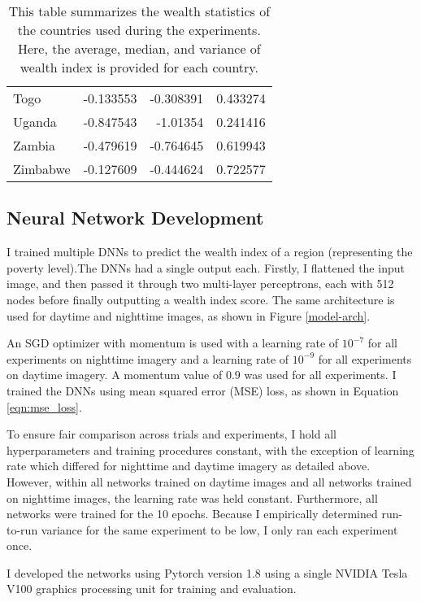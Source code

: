 \documentclass{article}
\begin{document}
\begin{table}[]
\begin{tabular}{lrrr}
 Togo                             & -0.133553   & -0.308391  &  0.433274  \\
 Uganda                           & -0.847543   & -1.01354   &  0.241416  \\
 Zambia                           & -0.479619   & -0.764645  &  0.619943  \\
 Zimbabwe                         & -0.127609   & -0.444624  &  0.722577  \\
\bottomrule
\end{tabular}
\caption{This table summarizes the wealth statistics of the countries used during the experiments. Here, the average, median, and variance of wealth index is provided for each country.}
\label{tab:countries}
\end{table}



\subsection{Neural Network Development}
I trained multiple DNNs to predict the wealth index of a region (representing the poverty level).The DNNs had a single output each. Firstly, I flattened the input image, and then passed it through two multi-layer perceptrons, each with 512 nodes before finally outputting a wealth index score. The same architecture is used for daytime and nighttime images, as shown in Figure \ref{model-arch}.

An SGD optimizer with momentum \cite{sgd} is used with a learning rate of $10^{-7}$ for all experiments on nighttime imagery and a learning rate of $10^{-9}$ for all experiments on daytime imagery. A momentum value of $0.9$ was used for all experiments. I trained the DNNs using mean squared error (MSE) loss, as shown in Equation \ref{eqn:mse_loss}.

To ensure fair comparison across trials and experiments, I hold all hyperparameters and training procedures constant, with the exception of learning rate which differed for nighttime and daytime imagery as detailed above. However, within all networks trained on daytime images and all networks trained on nighttime images, the learning rate was held constant. Furthermore, all networks were trained for the 10 epochs. Because I empirically determined run-to-run variance for the same experiment to be low, I only ran each experiment once.

I developed the networks using Pytorch version 1.8 \cite{nineteen} using a single NVIDIA Tesla V100 graphics processing unit for training and evaluation.
\end{document}
